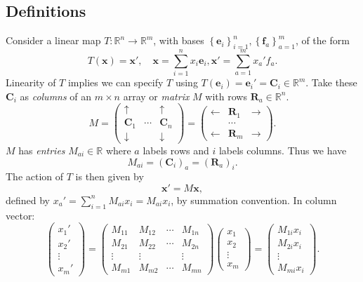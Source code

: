 \documentclass[10pt]{article}
\begin{document}
    \subsection{Definitions}
    Consider a linear map $ T:\mathbb{R}^{n}\to \mathbb{R}^{m} $, with bases $ \left\{ \mathbf{e}_i\right\}_{i=1}^n, \left\{ \mathbf{f}_a\right\}_{a=1}^m $, of the form 
    \[
        T(\mathbf{x})=\mathbf{x}',\quad \mathbf{x}=\sum_{i=1}^{n}x_i \mathbf{e}_i, \mathbf{x}'=\sum_{a=1}^{m} x_a' f_a 
    .\]
    Linearity of $T$ implies we can specify $T$ using $ T(\mathbf{e}_i)=\mathbf{e}_i'=\mathbf{C}_i\in \mathbb{R}^{m} $. Take these $ \mathbf{C}_i $ as \textit{columns} of an $ m \times n $ array or \textit{matrix} $M$ with rows $ \mathbf{R}_a\in \mathbb{R}^{n} $.
    \[
        M=\begin{pmatrix}
            \uparrow & & \uparrow \\
            \mathbf{C}_1 & \cdots & \mathbf{C}_n\\
            \downarrow & & \downarrow 
        \end{pmatrix}=\begin{pmatrix}
            \leftarrow & \mathbf{R}_1 & \rightarrow \\
            &\cdots &\\
            \leftarrow & \mathbf{R}_{m} & \rightarrow 
        \end{pmatrix}
    .\]
    $M$ has \textit{entries} $ M_{ai}\in \mathbb{R} $ where $a$ labels rows and $i$ labels columns. Thus we have 
    \[
        M_{ai} = (\mathbf{C}_i)_a=(\mathbf{R}_a)_i
    .\]
    The action of $T$ is then given by
    \[
        \mathbf{x}'=M \mathbf{x}
    ,\]
    defined by $ x_a'=\sum_{i=1}^{n}M_{ai}x_i = M_{ai}x_i $, by summation convention. In column vector:
    \[
        \begin{pmatrix}
            x_1'\\x_2'\\\vdots\\x_m'
        \end{pmatrix}=\begin{pmatrix}
            M_{11}&M_{12}&\cdots&M_{1n}\\
            M_{21}&M_{22}&\cdots&M_{2n}\\
            \vdots&\vdots&&\vdots\\
            M_{m1}&M_{m2}&\cdots&M_{mn}
        \end{pmatrix}\begin{pmatrix}
            x_1\\x_2\\\vdots\\x_m
        \end{pmatrix}=\begin{pmatrix}
            M_{1i}x_i\\M_{2i}x_i\\\vdots\\M_{mi}x_i
        \end{pmatrix}
    .\]
\end{document}
